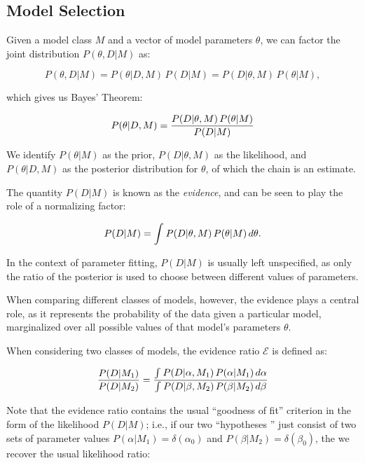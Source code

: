 \subsection{Model Selection}
\label{sec:evidence}

Given a model class $M$ and a vector of model parameters $\theta$, we
can factor the joint distribution $P(\theta,D|M)$ as:

\begin{equation}
P(\theta,D|M) = P(\theta|D,M)\, P(D|M) = P(D|\theta,M)\, P(\theta|M),
\end{equation}

which gives us Bayes' Theorem:

\begin{equation}
P(\theta|D,M) = {{P(D|\theta,M)\, P(\theta|M)}\over{P(D|M)}}
\end{equation}

We identify $P(\theta|M)$ as the prior, $P(D|\theta, M)$ as the
likelihood, and $P(\theta|D,M)$ as the posterior distribution for
$\theta$, of which the chain is an estimate.

The quantity $P(D|M)$ is known as the {\it evidence}, and can be seen
to play the role of a normalizing factor:

\begin{equation}
P(D|M) = \int^{}_{}{P(D|\theta,M)\, P(\theta|M)\,d\theta}.
\end{equation}

In the context of parameter fitting, $P(D|M)$ is usually left
unspecified, as only the ratio of the posterior is used to choose
between different values of parameters.

When comparing different classes of models, however, the evidence
plays a central role, as it represents the probability of the data
given a particular model, marginalized over all possible values of
that model's parameters $\theta$.

When considering two classes of models, the evidence ratio
$\mathcal{E}$ is defined as:

\begin{equation}
{{P(D|M_1)}\over{P(D|M_2)}} = {{\int^{}_{}{P(D|\alpha,M_1)\, P(\alpha|M_1)\,d\alpha}}\over{\int^{}_{}{P(D|\beta, M_2)\, P(\beta|M_2)\,d\beta}}}
\end{equation}

Note that the evidence ratio contains the usual ``goodness of fit''
criterion in the form of the likelihood $P(D|M)$; i.e.,
if our two ``hypotheses '' just consist of two sets of parameter
values $P(\alpha|M_1) = \delta(\alpha_0)$ and
$P(\beta|M_2) = \delta({\beta_0})$, the we recover the usual
likelihood ratio:

